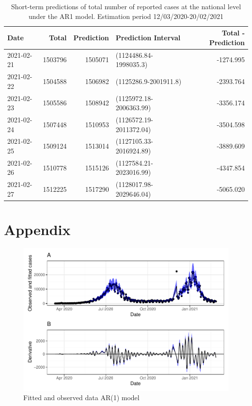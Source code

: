\documentclass[10pt,letterpaper]{article}
\begin{document}
\begin{table}[!h]

\caption{\label{tab:unnamed-chunk-10}Short-term predictions of total number of reported cases at the national level under the AR1 model. Estimation period 12/03/2020-20/02/2021}
\centering
\begin{tabular}[t]{l|r|r|l|r}
\hline
Date & Total & Prediction & Prediction Interval & Total - Prediction\\
\hline
2021-02-21 & 1503796 & 1505071 & (1124486.84-1998035.3) & -1274.995\\
\hline
2021-02-22 & 1504588 & 1506982 & (1125286.9-2001911.8) & -2393.764\\
\hline
2021-02-23 & 1505586 & 1508942 & (1125972.18-2006363.99) & -3356.174\\
\hline
2021-02-24 & 1507448 & 1510953 & (1126572.19-2011372.04) & -3504.598\\
\hline
2021-02-25 & 1509124 & 1513014 & (1127105.33-2016924.89) & -3889.609\\
\hline
2021-02-26 & 1510778 & 1515126 & (1127584.21-2023016.99) & -4347.854\\
\hline
2021-02-27 & 1512225 & 1517290 & (1128017.98-2029646.04) & -5065.020\\
\hline
\end{tabular}
\end{table}









\newpage

\hypertarget{appendix}{%
\section{Appendix}\label{appendix}}

\setcounter{table}{0} \renewcommand{\thetable}{S\arabic{table}} \setcounter{figure}{0} \renewcommand{\thefigure}{S\arabic{figure}}

\begin{figure}[H]
	\includegraphics[width=0.99\linewidth]{COVIDincidenceSA_files/figure-latex/unnamed-chunk-6-1} \caption{Fitted and observed data AR(1) model}\label{fig:unnamed-chunk-6}
\end{figure}
\end{document}
